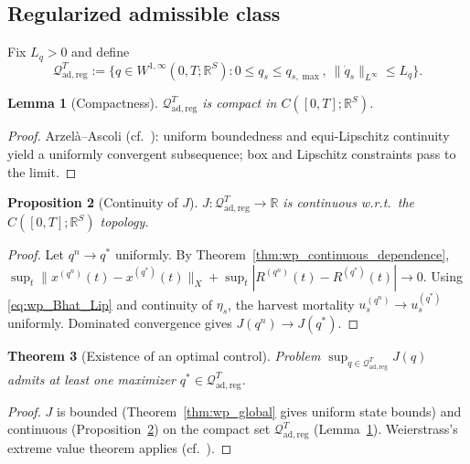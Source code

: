 \documentclass[pdflatex,sn-mathphys-num]{sn-jnl}%
\newtheorem{theorem}{Theorem}[section]
\newtheorem{proposition}[theorem]{Proposition}
\newtheorem{lemma}[theorem]{Lemma}
\begin{document}
\subsection{Regularized admissible class}
Fix \(L_q>0\) and define
\begin{equation}\label{eq:ocp_reg_controls}
\mathcal Q_{\mathrm{ad},\mathrm{reg}}^T
:=
\Big\{
q\in W^{1,\infty}(0,T;\mathbb R^S):
0\le q_s\le q_{s,\max},\
\|\dot q_s\|_{L^\infty}\le L_q
\Big\}.
\end{equation}

\begin{lemma}[Compactness]\label{lem:ocp_compact}
\(\mathcal Q_{\mathrm{ad},\mathrm{reg}}^T\) is compact in
\(C([0,T];\mathbb R^S)\).
\end{lemma}
\begin{proof}
Arzel\`a--Ascoli (cf.\ \cite{Barbu2010,liang2026separation,yosida2012functional}): uniform boundedness and equi-Lipschitz continuity yield a uniformly
convergent subsequence; box and Lipschitz constraints pass to the limit.
\end{proof}

\begin{proposition}[Continuity of \(J\)]\label{prop:ocp_J_continuous}
\(J:\mathcal Q_{\mathrm{ad},\mathrm{reg}}^T\to\mathbb R\)
is continuous w.r.t.\ the \(C([0,T];\mathbb R^S)\) topology.
\end{proposition}
\begin{proof}
Let \(q^n\to q^\ast\) uniformly. By Theorem~\ref{thm:wp_continuous_dependence},
\(\sup_t\|x^{(q^n)}(t)-x^{(q^\ast)}(t)\|_X+\sup_t|R^{(q^n)}(t)-R^{(q^\ast)}(t)|\to 0\).
Using \eqref{eq:wp_Bhat_Lip} and continuity of \(\eta_s\), the harvest mortality
\(u_s^{(q^n)}\to u_s^{(q^\ast)}\) uniformly. Dominated convergence gives
\(J(q^n)\to J(q^\ast)\).
\end{proof}

\begin{theorem}[Existence of an optimal control]\label{thm:ocp_existence}
Problem \(\sup_{q\in\mathcal Q_{\mathrm{ad},\mathrm{reg}}^T}J(q)\) admits at least one
maximizer \(q^\ast\in\mathcal Q_{\mathrm{ad},\mathrm{reg}}^T\).
\end{theorem}
\begin{proof}
\(J\) is bounded (Theorem~\ref{thm:wp_global} gives uniform state bounds) and continuous
(Proposition~\ref{prop:ocp_J_continuous}) on the compact set
\(\mathcal Q_{\mathrm{ad},\mathrm{reg}}^T\) (Lemma~\ref{lem:ocp_compact}).
Weierstrass's extreme value theorem applies (cf.\ \cite{rudin2021principles,yu2026size}).
\end{proof}
\end{document}
